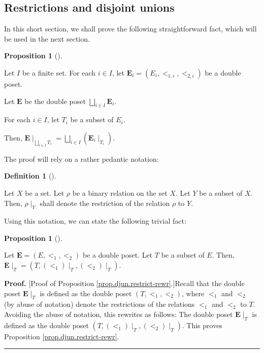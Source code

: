 \documentclass[numbers=enddot,12pt,final,onecolumn,notitlepage,abstracton]{scrartcl}
\theoremstyle{definition}
\newtheorem{prop}[theo]{Proposition}
\newenvironment{proposition}[1][]
{\begin{prop}[#1]\begin{leftbar}}
{\end{leftbar}\end{prop}}
\newtheorem{defi}[theo]{Definition}
\newenvironment{definition}[1][]
{\begin{defi}[#1]\begin{leftbar}}
{\end{leftbar}\end{defi}}
\newenvironment{proof}[1][Proof]{\noindent\textbf{#1.} }{\ \rule{0.5em}{0.5em}}
\newenvironment{verlong}{}{}
\begin{document}
\begin{verlong}
\begin{footnotesize}
\subsection{Restrictions and disjoint unions}

In this short section, we shall prove the following straightforward fact,
which will be used in the next section.

\begin{proposition}
\label{prop.djun.restrict}Let $I$ be a finite set. For each $i\in I$, let
$\mathbf{E}_{i}=\left(  E_{i},<_{1,i},<_{2,i}\right)  $ be a double poset.

Let $\mathbf{E}$ be the double poset $\bigsqcup_{i\in I}\mathbf{E}_{i}$.

For each $i\in I$, let $T_{i}$ be a subset of $E_{i}$.

Then, $\mathbf{E}\mid_{\bigsqcup_{i\in I}T_{i}}=\bigsqcup_{i\in I}\left(
\mathbf{E}_{i}\mid_{T_{i}}\right)  $.
\end{proposition}

The proof will rely on a rather pedantic notation:

\begin{definition}
Let $X$ be a set. Let $\rho$ be a binary relation on the set $X$. Let $Y$ be a
subset of $X$. Then, $\rho\mid_{Y}$ shall denote the restriction of the
relation $\rho$ to $Y$.
\end{definition}

Using this notation, we can state the following trivial fact:

\begin{proposition}
\label{prop.djun.restrict-rewr}Let $\mathbf{E}=\left(  E,<_{1},<_{2}\right)  $
be a double poset. Let $T$ be a subset of $E$. Then, $\mathbf{E}\mid
_{T}=\left(  T,\left(  <_{1}\right)  \mid_{T},\left(  <_{2}\right)  \mid
_{T}\right)  $.
\end{proposition}

\begin{proof}
[Proof of Proposition \ref{prop.djun.restrict-rewr}.]Recall that the double
poset ${\mathbf{E}}\mid_{T}$ is defined as the double poset $\left(
T,<_{1},<_{2}\right)  $, where $<_{1}$ and $<_{2}$ (by abuse of notation)
denote the restrictions of the relations $<_{1}$ and $<_{2}$ to $T$. Avoiding
the abuse of notation, this rewrites as follows: The double poset
${\mathbf{E}}\mid_{T}$ is defined as the double poset $\left(  T,\left(
<_{1}\right)  \mid_{T},\left(  <_{2}\right)  \mid_{T}\right)  $. This proves
Proposition \ref{prop.djun.restrict-rewr}.
\end{proof}


\end{footnotesize}
\end{verlong}
\end{document}
